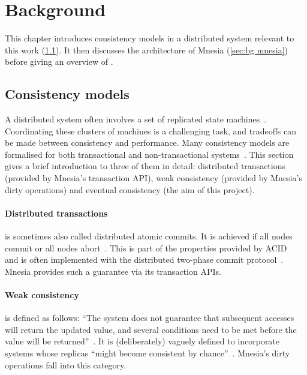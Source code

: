 \section{Background} \label{sec:bg}

This chapter introduces consistency models in a distributed system relevant 
to this work (\cref{sec:bg consistency models}). It then discusses the architecture 
of Mnesia (\cref{sec:bg mnesia}) before giving an overview of .

\subsection{Consistency models} \label{sec:bg consistency models}

A distributed system often involves a set of replicated state 
machines~\cite{lamport1978clock}. Coordinating these clusters of machines is a 
challenging task, and tradeoffs can be
made between consistency and performance. Many consistency models are formalised for 
both transactional and non-transactional systems~\cite{viotti2016consistency}. 
This section gives a brief
introduction to three of them in detail: distributed transactions (provided by
Mnesia's transaction API), weak consistency (provided by Mnesia's dirty operations)
and eventual consistency (the aim of this project).

\paragraph{Distributed transactions} is sometimes also called distributed atomic 
commits. It is achieved if all nodes commit
or all nodes abort~\cite{saltzer2009Principles}. This is part of the properties provided by 
ACID~\cite{haerder1983dbtransaction} and
is often implemented with the distributed two-phase commit protocol~\cite{bernstein1987concurrency}.
Mnesia provides such a guarantee via its transaction APIs.

\paragraph{Weak consistency}
is defined as follows:  
``The system does not guarantee that subsequent accesses will return the updated 
value, and several conditions need to be met before the value will be 
returned''~\cite{vogels2008ec,bermbach2013consistency,viotti2016consistency}.
It is (deliberately) vaguely defined to incorporate systems whose replicas
``might become consistent by chance''~\cite{bermbach2013consistency}. 
Mnesia's dirty operations fall into this category. 

